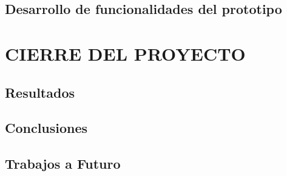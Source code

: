 \chapter{Desarrollo de funcionalidades del prototipo}



\part{ CIERRE DEL PROYECTO}

\begingroup
\renewcommand{\cleardoublepage}{}
\renewcommand{\clearpage}{}
\chapter{Resultados}

\endgroup

\newpage

\begingroup
\renewcommand{\cleardoublepage}{}
\renewcommand{\clearpage}{}
\chapter{Conclusiones}

\endgroup

\newpage

\begingroup
\renewcommand{\cleardoublepage}{}
\renewcommand{\clearpage}{}
\chapter{Trabajos a Futuro}

\endgroup



%
%
